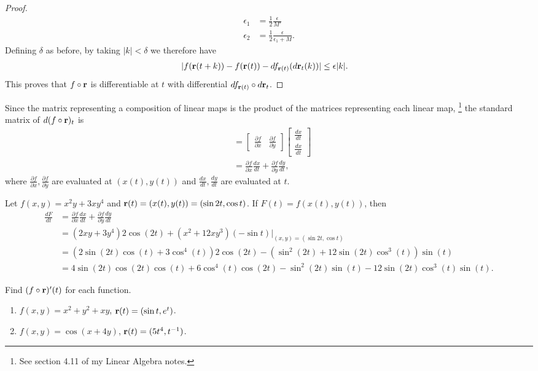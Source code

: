 \documentclass[12pt,letterpaper,reqno]{article}
\numberwithin{equation}{section}
\newcommand{\bbr}{{\bf r}}
\begin{document}
{\begin{proof}
\begin{align*}
	\epsilon_1&=\frac{1}{2}\frac{\epsilon}{M'} \\
	\epsilon_2&=\frac{1}{2}\frac{\epsilon}{\epsilon_1+M}.
\end{align*}
Defining $\delta$ as before, by taking $|k|<\delta$ we therefore have
\begin{align*}
	|f(\bbr(t+k))-f(\bbr(t))-df_{\bbr(t)}(d\bbr_t(k))|&\leq \epsilon|k|.
\end{align*}
This proves that $f \circ \bbr$ is differentiable at $t$ with differential $df_{\bbr(t)} \circ d\bbr_t$.
\end{proof}

Since the matrix representing a composition of linear maps is the product of the matrices representing each linear map, \footnote{See section 4.11 of my Linear Algebra notes.} the standard matrix of $d(f \circ \bbr)_{t}$ is
\begin{align*}
	[d(f \circ \bbr)_{t}]&=\begin{bmatrix}
		\frac{\partial f}{\partial x} & \frac{\partial f}{\partial y} 
	\end{bmatrix} \begin{bmatrix}
		\frac{dx}{dt} \\ \frac{dx}{dt}
	\end{bmatrix} \\
	&=\frac{\partial f}{\partial x}\frac{dx}{dt}+\frac{\partial f}{\partial y}\frac{dy}{dt},
\end{align*}
where $\frac{\partial f}{\partial x}, \frac{\partial f}{\partial y}$ are evaluated at $(x(t),y(t))$ and $\frac{dx}{dt}, \frac{dy}{dt}$ are evaluated at $t$.

\begin{example}
Let $f(x,y)=x^2y+3xy^4$ and $\bbr(t)=(x(t),y(t))=(\sin 2t, \cos t)$. If $F(t)=f(x(t),y(t))$, then
\begin{align*}
	\frac{dF}{dt}&=\frac{\partial f}{\partial x}\frac{dx}{dt}+\frac{\partial f}{\partial y}\frac{dy}{dt} \\
	&=(2xy+3y^4)2\cos(2t)+(x^2+12xy^3)(-\sin t)|_{(x,y)=(\sin 2t, \cos t)} \\
	&=(2\sin(2t)\cos(t)+3\cos^4(t))2\cos(2t)-(\sin^2(2t)+12\sin(2t)\cos^3(t))\sin(t) \\
	&=4\sin(2t)\cos(2t)\cos(t)+6\cos^4(t)\cos(2t)-\sin^2(2t)\sin(t)-12\sin(2t)\cos^3(t)\sin(t).
\end{align*}	
\end{example}

\begin{exercise}
Find $(f \circ \bbr)'(t)$ for each function.
\begin{enumerate}[(1)]
	\item $f(x,y)=x^2+y^2+xy$, $\bbr(t)=(\sin t,e^t)$.
	\item $f(x,y)=\cos(x+4y)$, $\bbr(t)=(5t^4,t^{-1})$.
\end{enumerate}	
\end{exercise}

}
\end{document}
